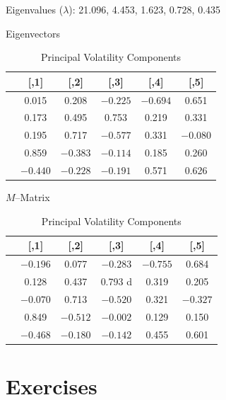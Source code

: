 	\begin{table}[H]
	\centering
	\caption{Principal Volatility Components \label{tab:pvctable}}
	Eigenvalues ($\lambda$): 21.096, 4.453, 1.623, 0.728, 0.435
	
	Eigenvectors
	
	\begin{tabular}{| l | c | c | c | c | c |} \hline
        &    [,1]   &    [,2]    &   [,3]    &   [,4]   &     [,5] \\ \hline
	[1,] & 0.015 & 0.208 & $-0.225$ & $-0.694$ &  0.651 \\ \hline
	[2,] & 0.173 & 0.495 & 0.753 & 0.219 & 0.331 \\ \hline
	[3,] & 0.195 & 0.717 & $-0.577$ & 0.331 & $-0.080$ \\ \hline
	[4,] & 0.859 & $-0.383$ & $-0.114$ & 0.185 & 0.260 \\ \hline
	[5,] & $-0.440$ & $-0.228$ & $-0.191$ & 0.571 & 0.626 \\
	\end{tabular}
	
	$M$--Matrix \\[0.1cm]
	
	\begin{tabular}{| l | c | c | c | c | c |} \hline
	         &   [,1]   &     [,2]    &     [,3]   &    [,4]   &    [,5] \\ \hline
	[1,] & $-0.196$ & 0.077 & $-0.283$ & $-0.755$ & 0.684 \\ \hline
	[2,] & 0.128 & 0.437 & 0.793 d & 0.319 & 0.205 \\ \hline
	[3,]& $-0.070$ & 0.713 & $-0.520$ & 0.321 & $-0.327$ \\ \hline
	[4,] & 0.849 & $-0.512$ & $-0.002$ & 0.129 & 0.150 \\ \hline
	[5,] & $-0.468$ & $-0.180$ & $-0.142$ & 0.455 & 0.601 \\
	\end{tabular}
	\end{table}




\section{Exercises}

